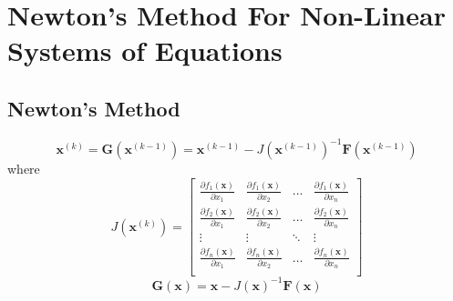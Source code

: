 \documentclass[../main-sheet.tex]{subfiles}
\begin{document}
\chapter{Newton's Method For Non-Linear Systems of Equations}
\section{Newton's Method}
\[
    \mathbf{x}^{(k)}=\mathbf{G}\left( \mathbf{x}^{(k-1)} \right)=\mathbf{x}^{(k-1)}-J\left( \mathbf{x}^{(k-1)} \right)^{-1}\mathbf{F}\left( \mathbf{x}^{(k-1)} \right)
\]
where
\[
    J(\mathbf{x}^{(k)})=\begin{bmatrix}
        \frac{\partial f_1(\mathbf{x})}{\partial x_1} & \frac{\partial f_1(\mathbf{x})}{\partial x_2} &\dots&\frac{\partial f_1(\mathbf{x})}{\partial x_n} \\[3pt]
        \frac{\partial f_2(\mathbf{x})}{\partial x_1} & \frac{\partial f_2(\mathbf{x})}{\partial x_2} &\dots&\frac{\partial f_2(\mathbf{x})}{\partial x_n} \\[3pt]
        \vdots & \vdots & \ddots & \vdots\\
        \frac{\partial f_n(\mathbf{x})}{\partial x_1} & \frac{\partial f_n(\mathbf{x})}{\partial x_2} &\dots&\frac{\partial f_n(\mathbf{x})}{\partial x_n} \\
    \end{bmatrix}
\]
\[
    \mathbf{G}\left( \mathbf{x} \right)=\mathbf{x}-J\left( \mathbf{x}\right)^{-1}\mathbf{F}\left( \mathbf{x} \right)
\]
\end{document}
